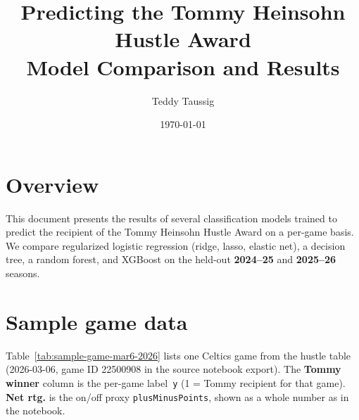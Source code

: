 \documentclass[11pt]{article}
\title{Predicting the Tommy Heinsohn Hustle Award\\
       \large Model Comparison and Results}
\author{Teddy Taussig}
\date{\today}
\begin{document}
\maketitle

\section{Overview}
This document presents the results of several classification models
trained to predict the recipient of the Tommy Heinsohn Hustle Award on
a per-game basis. We compare regularized logistic regression (ridge,
lasso, elastic net), a decision tree, a random forest, and XGBoost on
the held-out \textbf{2024--25} and \textbf{2025--26} seasons.

\section{Sample game data}
Table~\ref{tab:sample-game-mar6-2026} lists one Celtics game from the
hustle table (2026-03-06, game ID 22500908 in the source notebook export). The
\textbf{Tommy winner} column is the per-game label~\texttt{y} (1 = Tommy
recipient for that game). \textbf{Net rtg.} is the on/off proxy
\texttt{plusMinusPoints}, shown as a whole number as in the notebook.
\end{document}
